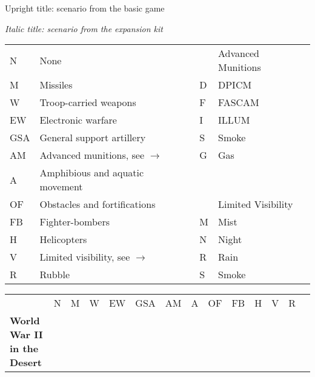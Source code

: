 \documentclass[a4paper]{article}
\newenvironment{texte}{\rmfamily\footnotesize}{}
\begin{document}
\begin{texte}


Upright title: scenario from the basic game

\textit{Italic title: scenario from the expansion kit}

\vspace*{5mm}

\begin{tabular}{llll}
N    &   None                                  &   & Advanced Munitions\\
M    &   Missiles                              & D & DPICM  \\
W    &   Troop-carried weapons                 & F & FASCAM \\
EW   &   Electronic warfare                    & I & ILLUM  \\
GSA  &   General support artillery             & S & Smoke  \\ 
AM   &   Advanced munitions, see $\rightarrow$ & G & Gas    \\ 
A    &   Amphibious and aquatic movement  \\
OF   &   Obstacles and fortifications          &   & Limited Visibility \\
FB   &   Fighter-bombers                       & M & Mist   \\
H    &   Helicopters                           & N & Night  \\
V    &   Limited visibility, see $\rightarrow$ & R & Rain   \\
R    &   Rubble                                & S & Smoke  \\
\end{tabular}

\begin{tabular}{lccccccccccccl}
                                                   & N &  M &  W & EW & GSA & AM & A & OF & FB & H &  V & R \\

\bf World War II in the Desert \\


\end{tabular}
\end{texte}
\end{document}
